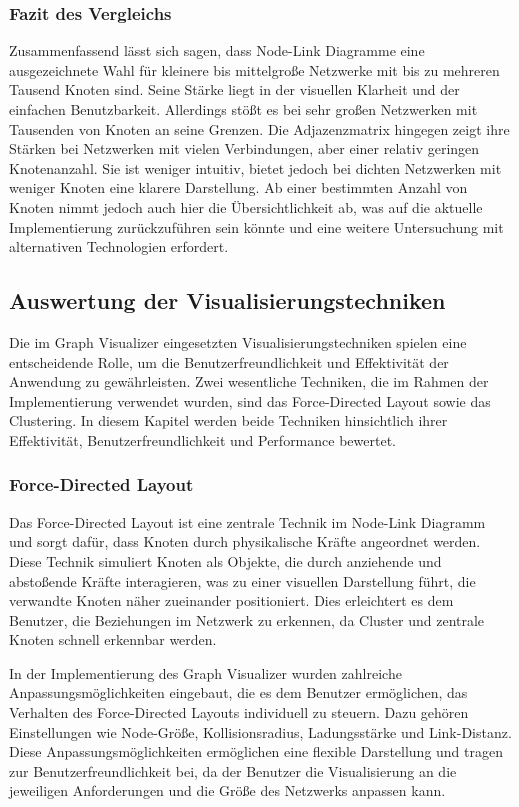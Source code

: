 \subsubsection{Fazit des Vergleichs}

Zusammenfassend lässt sich sagen, dass Node-Link Diagramme eine ausgezeichnete Wahl für kleinere bis mittelgroße Netzwerke mit bis zu mehreren Tausend Knoten sind. Seine Stärke liegt in der visuellen Klarheit und der einfachen Benutzbarkeit. Allerdings stößt es bei sehr großen Netzwerken mit Tausenden von Knoten an seine Grenzen. Die Adjazenzmatrix hingegen zeigt ihre Stärken bei Netzwerken mit vielen Verbindungen, aber einer relativ geringen Knotenanzahl. Sie ist weniger intuitiv, bietet jedoch bei dichten Netzwerken mit weniger Knoten eine klarere Darstellung. Ab einer bestimmten Anzahl von Knoten nimmt jedoch auch hier die Übersichtlichkeit ab, was auf die aktuelle Implementierung zurückzuführen sein könnte und eine weitere Untersuchung mit alternativen Technologien erfordert.

\subsection{Auswertung der Visualisierungstechniken}

Die im Graph Visualizer eingesetzten Visualisierungstechniken spielen eine entscheidende Rolle, um die Benutzerfreundlichkeit und Effektivität der Anwendung zu gewährleisten. Zwei wesentliche Techniken, die im Rahmen der Implementierung verwendet wurden, sind das Force-Directed Layout sowie das Clustering. In diesem Kapitel werden beide Techniken hinsichtlich ihrer Effektivität, Benutzerfreundlichkeit und Performance bewertet.

\subsubsection{Force-Directed Layout}

Das Force-Directed Layout ist eine zentrale Technik im Node-Link Diagramm und sorgt dafür, dass Knoten durch physikalische Kräfte angeordnet werden. Diese Technik simuliert Knoten als Objekte, die durch anziehende und abstoßende Kräfte interagieren, was zu einer visuellen Darstellung führt, die verwandte Knoten näher zueinander positioniert. Dies erleichtert es dem Benutzer, die Beziehungen im Netzwerk zu erkennen, da Cluster und zentrale Knoten schnell erkennbar werden.

In der Implementierung des Graph Visualizer wurden zahlreiche Anpassungsmöglichkeiten eingebaut, die es dem Benutzer ermöglichen, das Verhalten des Force-Directed Layouts individuell zu steuern. Dazu gehören Einstellungen wie Node-Größe, Kollisionsradius, Ladungsstärke und Link-Distanz. Diese Anpassungsmöglichkeiten ermöglichen eine flexible Darstellung und tragen zur Benutzerfreundlichkeit bei, da der Benutzer die Visualisierung an die jeweiligen Anforderungen und die Größe des Netzwerks anpassen kann.


